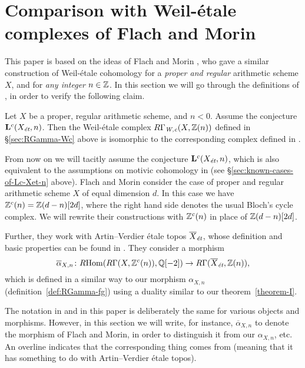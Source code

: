 \documentclass{article}
\numberwithin{equation}{section}
\begin{document}

\section{Comparison with Weil-étale complexes of Flach and Morin}
\label{sec:comparison-with-FM}

This paper is based on the ideas of Flach and Morin \cite{Flach-Morin-2018}, who
gave a similar construction of Weil-étale cohomology for a
\emph{proper and regular} arithmetic scheme $X$, and for \emph{any integer}
$n \in \ZZ$. In this section we will go through the definitions of
\cite{Flach-Morin-2018}, in order to verify the following claim.

\begin{proposition}
  \label{prop:comparison-with-FM}
  Let $X$ be a proper, regular arithmetic scheme, and $n < 0$. Assume the
  conjecture $\mathbf{L}^c (X_\et, n)$. Then the Weil-étale complex
  $R\Gamma_\Wc (X, \ZZ(n))$ defined in \S\ref{sec:RGamma-Wc} above is isomorphic
  to the corresponding complex defined in \cite{Flach-Morin-2018}.
\end{proposition}

From now on we will tacitly assume the conjecture $\mathbf{L}^c (X_\et, n)$,
which is also equivalent to the assumptions on motivic cohomology in
\cite{Flach-Morin-2018} (see \S\ref{sec:known-cases-of-Lc-Xet-n} above). Flach
and Morin consider the case of proper and regular arithmetic scheme $X$ of equal
dimension $d$. In this case we have $\ZZ^c (n) = \ZZ (d-n) [2d]$, where the
right hand side denotes the usual Bloch's cycle complex. We will rewrite their
constructions with $\ZZ^c (n)$ in place of $\ZZ (d-n) [2d]$.

Further, they work with Artin--Verdier étale topos $\overline{X}_\et$, whose
definition and basic properties can be found in \cite[\S 6]{Flach-Morin-2018}.
They consider a morphism
\[ \overline{\alpha}_{X,n}\colon \RHom (R\Gamma (X, \ZZ^c (n)), \QQ [-2]) \to
  R\Gamma (\overline{X}_\et, \ZZ (n)), \]
which is defined in a similar way to our morphism $\alpha_{X,n}$
(definition~\ref{def:RGamma-fg}) using a duality similar to our
theorem~\ref{theorem-I}.

The notation in \cite{Flach-Morin-2018} and in this paper is deliberately the
same for various objects and morphisms. However, in this section we will write,
for instance, $\overline{\alpha}_{X,n}$ to denote the morphism of Flach and
Morin, in order to distinguish it from our $\alpha_{X,n}$, etc. An overline
indicates that the corresponding thing comes from \cite{Flach-Morin-2018}
(meaning that it has something to do with Artin--Verdier étale topos).
\end{document}

